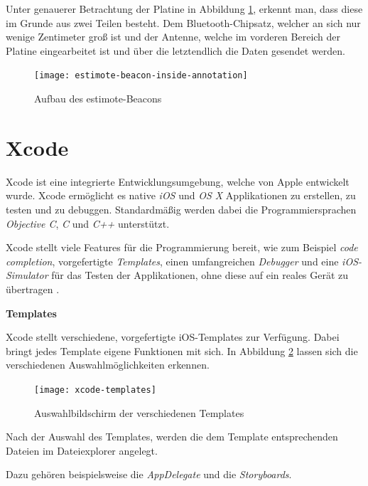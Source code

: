 Unter genauerer Betrachtung der Platine in Abbildung \ref{estimote-beacon-inside-annotations}, erkennt man, dass diese im Grunde aus zwei Teilen besteht.
Dem Bluetooth-Chipsatz, welcher an sich nur wenige Zentimeter groß ist und der Antenne, welche im vorderen Bereich der Platine eingearbeitet ist und über die letztendlich die Daten gesendet werden.

\begin{figure}[h!]
	\centering
	\texttt{[image: estimote-beacon-inside-annotation]}
	\caption{Aufbau des estimote-Beacons}
	\label{estimote-beacon-inside-annotations}
\end{figure}



\section{Xcode}
\label{sec:tools:xcode}
Xcode ist eine integrierte Entwicklungsumgebung, welche von Apple entwickelt wurde. Xcode ermöglicht es native \emph{iOS} und \emph{OS X} Applikationen zu erstellen, zu testen und zu debuggen.
Standardmäßig werden dabei die Programmiersprachen \emph{Objective C}, \emph{C} und \emph{C++} unterstützt.

Xcode stellt viele Features für die Programmierung bereit, wie zum Beispiel \emph{code completion}, vorgefertigte \emph{Templates}, einen umfangreichen \emph{Debugger} und eine \emph{iOS-Simulator} für das Testen der Applikationen, ohne diese auf ein reales Gerät zu übertragen \cite{xcodeinfo}.


\textbf{Templates}

Xcode stellt verschiedene, vorgefertigte iOS-Templates zur Verfügung. 
Dabei bringt jedes Template eigene Funktionen mit sich. In Abbildung \ref{xcode-templates} lassen sich die verschiedenen Auswahlmöglichkeiten erkennen.

\begin{figure}[htb!]
		\centering
	\texttt{[image: xcode-templates]}
	\caption{Auswahlbildschirm der verschiedenen Templates}
	\label{xcode-templates}
\end{figure}

Nach der Auswahl des Templates, werden die dem Template entsprechenden Dateien im Dateiexplorer angelegt.


Dazu gehören beispielsweise die \emph{AppDelegate} und die \emph{Storyboards}.

